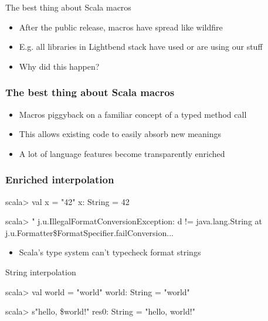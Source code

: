 \documentclass[svgnames,dvipsnames,hyperref={bookmarks=false},usepdftitle=false]{beamer}
\begin{document}

\begin{frame}{The best thing about Scala macros}
\begin{itemize}
\item After the public release, macros have spread like wildfire
\item E.g. all libraries in Lightbend stack have used or are using our stuff
\item Why did this happen?
\end{itemize}
\end{frame}

\begin{frame}[fragile]
\frametitle{The best thing about Scala macros}

\begin{itemize}
\item Macros piggyback on a familiar concept of a typed method call
\item This allows existing code to easily absorb new meanings
\item A lot of language features become transparently enriched
\end{itemize}
\end{frame}

\begin{frame}[fragile]
\frametitle{Enriched interpolation}

\begin{semiverbatim}
scala> val x = "42"
x: String = 42

scala> "%
j.u.IllegalFormatConversionException: d != java.lang.String
  at j.u.Formatter\$FormatSpecifier.failConversion...
\end{semiverbatim}

\begin{itemize}
\item Scala's type system can't typecheck format strings
\end{itemize}
\end{frame}

\begin{frame}[fragile]{String interpolation}
\begin{semiverbatim}
scala> val world = "world"
world: String = "world"

scala> s"hello, \$world!"
res0: String = "hello, world!"


\end{semiverbatim}
\end{frame}
\end{document}
